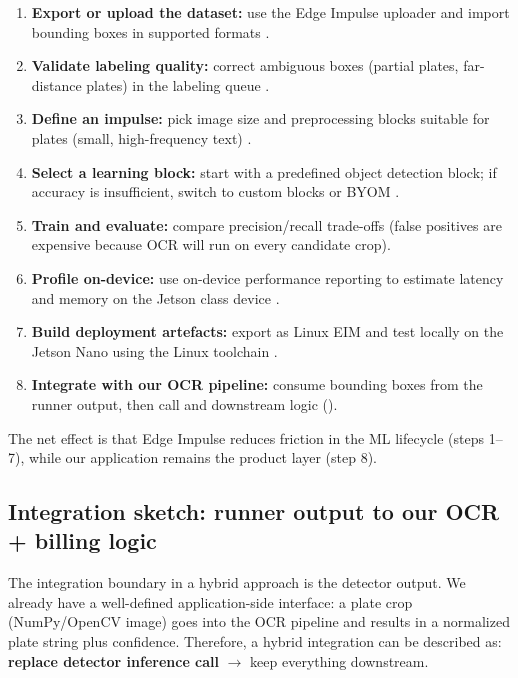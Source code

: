\begin{enumerate}
	\item \textbf{Export or upload the dataset:} use the Edge Impulse uploader and import bounding boxes in supported formats \cite{EdgeImpulseUploader,EdgeImpulseObjectDetectionLabelFormats}.
	\item \textbf{Validate labeling quality:} correct ambiguous boxes (partial plates, far-distance plates) in the labeling queue \cite{EdgeImpulseLabelingQueue}.
	\item \textbf{Define an impulse:} pick image size and preprocessing blocks suitable for plates (small, high-frequency text) \cite{EdgeImpulseImpulseDesign}.
	\item \textbf{Select a learning block:} start with a predefined object detection block; if accuracy is insufficient, switch to custom blocks or BYOM \cite{EdgeImpulseLearningBlocks,EdgeImpulseBYOM}.
	\item \textbf{Train and evaluate:} compare precision/recall trade-offs (false positives are expensive because OCR will run on every candidate crop).
	\item \textbf{Profile on-device:} use on-device performance reporting to estimate latency and memory on the Jetson class device \cite{EdgeImpulseOnDevicePerformance}.
	\item \textbf{Build deployment artefacts:} export as Linux EIM and test locally on the Jetson Nano using the Linux toolchain \cite{EdgeImpulseLinuxCLI,EdgeImpulseLinuxEIM}.
	\item \textbf{Integrate with our OCR pipeline:} consume bounding boxes from the runner output, then call  and downstream logic ().
\end{enumerate}

\noindent
The net effect is that Edge Impulse reduces friction in the ML lifecycle (steps 1--7), while our application remains the product layer (step 8).

\subsection{Integration sketch: runner output to our OCR + billing logic}
\label{sec:edge_impulse_integration_sketch}

\noindent
The integration boundary in a hybrid approach is the detector output.
We already have a well-defined application-side interface: a plate crop (NumPy/OpenCV image) goes into the OCR pipeline and results in a normalized plate string plus confidence.
Therefore, a hybrid integration can be described as: \textbf{replace detector inference call} $\rightarrow$ keep everything downstream.

